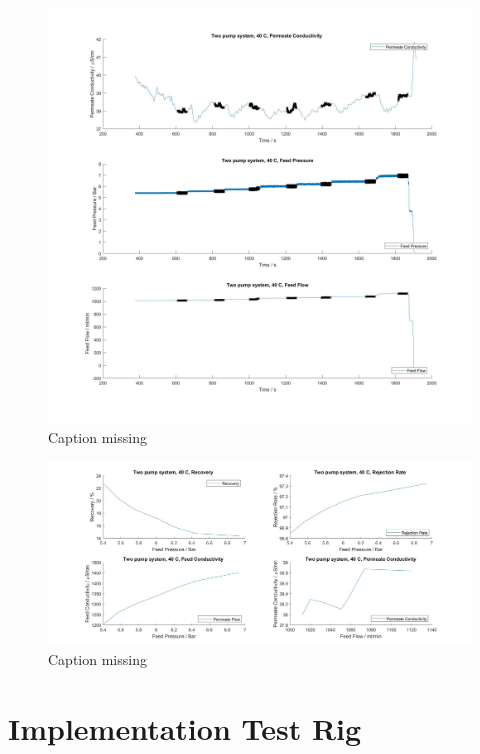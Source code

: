\begin{figure}[H]
    \centering
    \includegraphics[width=1.1\textwidth]{RecIncrease40}
    \caption{Caption missing}
    \label{fig:PressConn}
\end{figure}

\begin{figure}[H]
    \centering
    \includegraphics[width=1.1\textwidth]{RecIncrease40Key}
    \caption{Caption missing}
    \label{fig:PressConn}
\end{figure}



\section{Implementation Test Rig}


